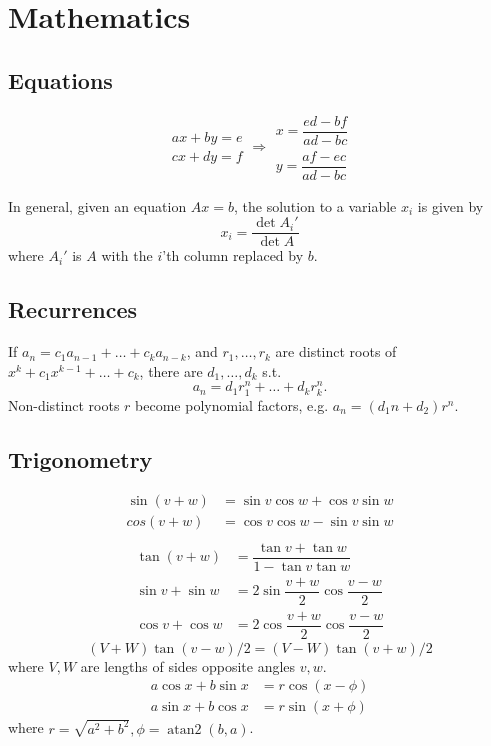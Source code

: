 
\chapter{Mathematics}

\section{Equations}

\[\begin{aligned}ax+by=e\\cx+dy=f\end{aligned}
\Rightarrow
\begin{aligned}x=\dfrac{ed-bf}{ad-bc}\\y=\dfrac{af-ec}{ad-bc}\end{aligned}\]

In general, given an equation $Ax = b$, the solution to a variable $x_i$ is given by
\[x_i = \frac{\det A_i'}{\det A} \]
where $A_i'$ is $A$ with the $i$'th column replaced by $b$.

\section{Recurrences}
If $a_n = c_1 a_{n-1} + \dots + c_k a_{n-k}$, and $r_1, \dots, r_k$ are distinct roots of $x^k + c_1 x^{k-1} + \dots + c_k$, there are $d_1, \dots, d_k$ s.t.
\[a_n = d_1r_1^n + \dots + d_kr_k^n. \]
Non-distinct roots $r$ become polynomial factors, e.g. $a_n = (d_1n + d_2)r^n$.

\section{Trigonometry}
\begin{align*}
\sin(v+w)&{}=\sin v\cos w+\cos v\sin w\\
cos(v+w)&{}=\cos v\cos w-\sin v\sin w\\
\end{align*}
\begin{align*}
\tan(v+w)&{}=\dfrac{\tan v+\tan w}{1-\tan v\tan w}\\
\sin v+\sin w&{}=2\sin\dfrac{v+w}{2}\cos\dfrac{v-w}{2}\\
\cos v+\cos w&{}=2\cos\dfrac{v+w}{2}\cos\dfrac{v-w}{2}
\end{align*}
\[ (V+W)\tan(v-w)/2{}=(V-W)\tan(v+w)/2 \]
where $V, W$ are lengths of sides opposite angles $v, w$.
\begin{align*}
	a\cos x+b\sin x&=r\cos(x-\phi)\\
	a\sin x+b\cos x&=r\sin(x+\phi)
\end{align*}
where $r=\sqrt{a^2+b^2}, \phi=\operatorname{atan2}(b,a)$.


